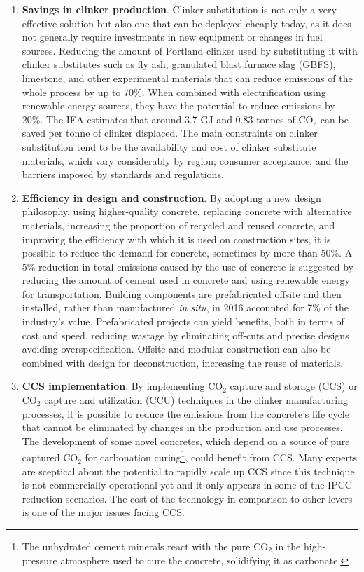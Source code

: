 \begin{enumerate}
\item \textbf{Savings in clinker production}. Clinker substitution is not only a very effective solution but also one that can be deployed cheaply today, as it does not generally require investments in new equipment or changes in fuel sources.\autocite{lehne2018making} Reducing the amount of Portland clinker used by substituting it with clinker substitutes such as fly ash, granulated blast furnace slag (GBFS), limestone, and other experimental materials that can reduce emissions of the whole process by up to 70\%. When combined with electrification using renewable energy sources, they have the potential to reduce emissions by 20\%. The IEA estimates that around 3.7 GJ and 0.83 tonnes of CO$_2$ can be saved per tonne of clinker displaced.\autocite{iea2017energy} The main constraints on clinker substitution tend to be the availability and cost of clinker substitute materials, which vary considerably by region; consumer acceptance; and the barriers imposed by standards and regulations.\autocite{imbabi2012trends}
\item \textbf{Efficiency in design and construction}. By adopting a new design philosophy, using higher-quality concrete, replacing concrete with alternative materials, increasing the proportion of recycled and reused concrete, and improving the efficiency with which it is used on construction sites, it is possible to reduce the demand for concrete, sometimes by more than 50\%.\autocite{lehne2018making} A 5\% reduction in total emissions caused by the use of concrete is suggested by reducing the amount of cement used in concrete and using renewable energy for transportation.\autocite{aus_2022} Building components are prefabricated offsite and then installed, rather than manufactured \textit{in situ}, in 2016 accounted for 7\% of the industry’s value.\autocite{pickard2020phasing} Prefabricated projects can yield benefits, both in terms of cost and speed, reducing wastage by eliminating off-cuts and precise designs avoiding overspecification.\autocite{science2018off} Offsite and modular construction can also be combined with design for deconstruction, increasing the reuse of materials.\autocite{BRE_2015}
\item \textbf{CCS implementation}. By implementing CO$_2$ capture and storage (CCS) or CO$_2$ capture and utilization (CCU) techniques in the clinker manufacturing processes, it is possible to reduce the emissions from the concrete's life cycle that cannot be eliminated by changes in the production and use processes. The development of some novel concretes, which depend on a source of pure captured CO$_2$ for carbonation curing\footnote{The unhydrated cement minerals react with the pure CO$_2$ in the high-pressure atmosphere used to cure the concrete, solidifying it as carbonate.}, could benefit from CCS. Many experts are sceptical about the potential to rapidly scale up CCS since this technique is not commercially operational yet and it only appears in some of the IPCC reduction scenarios. The cost of the technology in comparison to other levers is one of the major issues facing CCS.
\end{enumerate}

